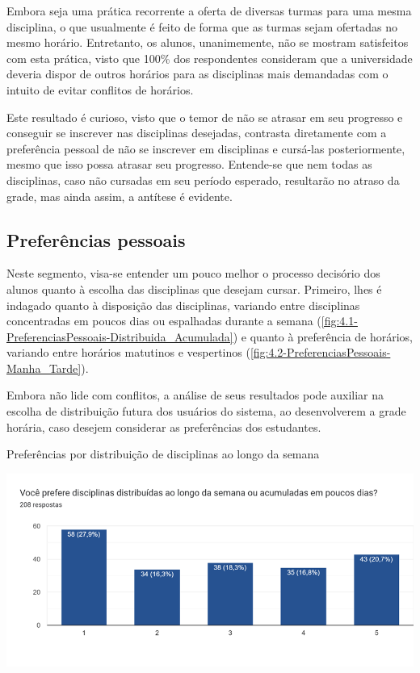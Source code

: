 Embora seja uma prática recorrente a oferta de diversas turmas para uma mesma disciplina, o que usualmente é feito de forma que as turmas sejam ofertadas no mesmo horário. Entretanto, os alunos, unanimemente, não se mostram satisfeitos com esta prática, visto que 100\% dos respondentes consideram que a universidade deveria dispor de outros horários para as disciplinas mais demandadas com o intuito de evitar conflitos de horários.

Este resultado é curioso, visto que o temor de não se atrasar em seu progresso e conseguir se inscrever nas disciplinas desejadas, contrasta diretamente com a preferência pessoal de não se inscrever em disciplinas e cursá-las posteriormente, mesmo que isso possa atrasar seu progresso. Entende-se que nem todas as disciplinas, caso não cursadas em seu período esperado, resultarão no atraso da grade, mas ainda assim, a antítese é evidente.

\subsection{Preferências pessoais} %

Neste segmento, visa-se entender um pouco melhor o processo decisório dos alunos quanto à escolha das disciplinas que desejam cursar. Primeiro, lhes é indagado quanto à disposição das disciplinas, variando entre disciplinas concentradas em poucos dias ou espalhadas durante a semana (\autoref{fig:4.1-PreferenciasPessoais-Distribuida_Acumulada}) e quanto à preferência de horários, variando entre horários matutinos e vespertinos (\autoref{fig:4.2-PreferenciasPessoais-Manha_Tarde}).

Embora não lide com conflitos, a análise de seus resultados pode auxiliar na escolha de distribuição futura dos usuários do sistema, ao desenvolverem a grade horária, caso desejem considerar as preferências dos estudantes.

\begin{MyCenteredFigure}
  \caption{Preferências por distribuição de disciplinas ao longo da semana}
  \label{fig:4.1-PreferenciasPessoais-Distribuida_Acumulada}
  \includegraphics[width=\textwidth]{files/img/2.02!3-organizacao/2.02!3.1.4-forms/4.1-PreferenciasPessoais-Distribuida_Acumulada}
\end{MyCenteredFigure} %

